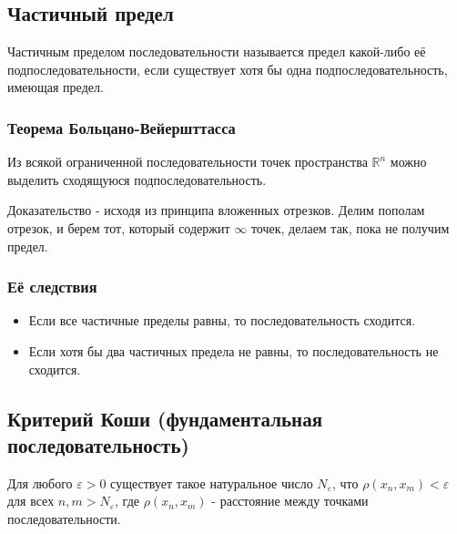 \subsection{Частичный предел}

Частичным пределом последовательности называется предел какой-либо её подпоследовательности, если существует хотя бы одна подпоследовательность, имеющая предел.

\subsubsection{Теорема Больцано-Вейершттасса}


Из всякой ограниченной последовательности точек пространства $\mathbb{R}^n$ можно выделить сходящуюся подпоследовательность.

Доказательство - исходя из принципа вложенных отрезков. Делим пополам отрезок, и берем тот, который содержит $\infty$ точек, делаем так, пока не получим предел.

\subsubsection{Её следствия}


\begin{itemize}
\item 
Если все частичные пределы равны, то последовательность сходится.

\item 
Если хотя бы два частичных предела не равны, то последовательность не сходится.

\end{itemize}

\subsection{Критерий Коши (фундаментальная последовательность)}

Для любого $\varepsilon > 0$ существует такое натуральное число $N_\varepsilon$, что $\rho(x_{n}, x_{m}) < \varepsilon\ $ для всех $ n, m > N_\varepsilon$, где $\rho(x_{n}, x_{m})$ - расстояние между точками последовательности.